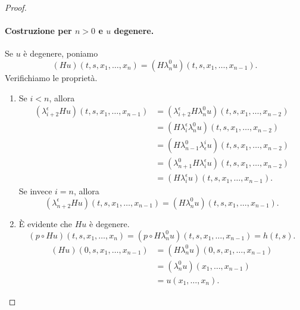 \begin{proof}
\paragraph{Costruzione per \(n>0\) e \(u\) degenere.}
Se \(u\) è degenere, poniamo
\[
(Hu)(t,s,x_1,\ldots,x_n)=(H\lambda^0_nu)(t,s,x_1,\ldots,x_{n-1}).
\]
Verifichiamo le proprietà.
\begin{enumerate}
\eqitem
\begin{align*}
(\lambda^\epsilon_2Hu)(t,x_1,\ldots,x_n)&=(\lambda^\epsilon_2H\lambda^0_nu)(t,x_1,\ldots,x_{n-1})\\
&=(T_\epsilon\lambda^0_nu)(t,x_1,\ldots,x_{n-1})\\
&=(\lambda^0_{n+1}T_\epsilon u)(t,x_1,\ldots,x_{n-1})\\
&=T_\epsilon u(t,x_1,\ldots,x_{n-1},x_n).
\end{align*}
\item Se \(i<n\), allora
\begin{align*}
(\lambda^\epsilon_{i+2}Hu)(t,s,x_1,\ldots,x_{n-1})&=(\lambda^\epsilon_{i+2}H\lambda^0_nu)(t,s,x_1,\ldots,x_{n-2})\\
&=(H\lambda^\epsilon_i\lambda^0_nu)(t,s,x_1,\ldots,x_{n-2})\\
&=(H\lambda^0_{n-1}\lambda^i_\epsilon u)(t,s,x_1,\ldots,x_{n-2})\\
&=(\lambda^0_{n+1}H\lambda^\epsilon_iu)(t,s,x_1,\ldots,x_{n-2})\\
&=(H\lambda^\epsilon_iu)(t,s,x_1,\ldots,x_{n-1}).
\end{align*}
Se invece \(i=n\), allora
\[
(\lambda^\epsilon_{n+2}Hu)(t,s,x_1,\ldots,x_{n-1})=(H\lambda^0_nu)(t,s,x_1,\ldots,x_{n-1}).
\]
\item È evidente che \(Hu\) è degenere.
\eqitem
\[
(p\circ Hu)(t,s,x_1,\ldots,x_n)=(p\circ H\lambda^0_nu)(t,s,x_1,\ldots,x_{n-1})=h(t,s).
\]
\eqitem
\begin{align*}
(Hu)(0,s,x_1,\ldots,x_{n-1})&=(H\lambda^0_nu)(0,s,x_1,\ldots,x_{n-1})\\
&=(\lambda^0_nu)(x_1,\ldots,x_{n-1})\\
&=u(x_1,\ldots,x_n).
\end{align*}
\end{enumerate}

\end{proof}
